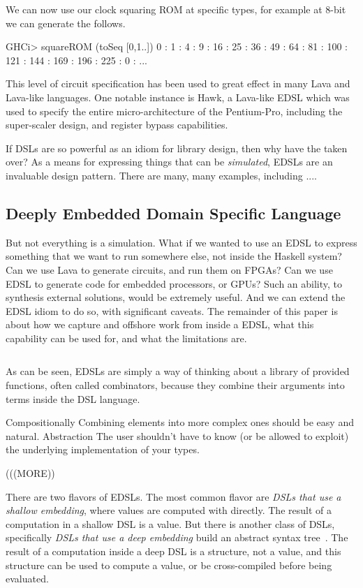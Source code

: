 \documentclass[11pt]{article}
\newcommand{\cursor}{%
\begin{center}
\marginpar{\vskip 4pt\sc Cursor}
\begin{tabular*}{\linewidth}{c}
\hline
\end{tabular*}
\end{center}
}
\begin{document}
We can now use our clock squaring ROM at specific types,
for example at 8-bit we can generate the follows.
\begin{Code}
GHCi> squareROM (toSeq [0,1..])        
0 : 1 : 4 : 9 : 16 : 25 : 36 : 49 : 64 : 81 : 100 : 121 : 144 : 169 : 196 : 225 : 0 : ...
\end{Code}

This level of circuit specification has been used to great
effect in many Lava and Lava-like languages. One notable
instance is Hawk, a Lava-like EDSL which was used to specify
the entire micro-architecture of the Pentium-Pro, including the
super-scaler design, and register bypass capabilities.

If DSLs are so powerful as an idiom for library design, then why have the taken over?
As a means for expressing things that can be {\em simulated\/}, EDSLs are an invaluable
design pattern. There are many, many examples, including ....

\subsection{Deeply Embedded Domain Specific Language}

But not everything is a simulation. What if we wanted to use an EDSL to express
something that we want to run somewhere else, not inside the Haskell system?
Can we use Lava to generate circuits, and run them on FPGAs? Can we use EDSL
to generate code for embedded processors, or GPUs? Such an ability, to 
synthesis external solutions, would be extremely useful. And we can extend
the EDSL idiom to do so, with significant caveats. The remainder of this
paper is about how we capture and offshore work from inside a EDSL, what
this capability can be used for, and what the limitations are.

\cursor{}

As can be seen, EDSLs are simply a way of thinking about a library
of provided functions, often called combinators, because they combine
their arguments into terms inside the DSL language.

Compositionally
Combining elements into more complex ones should be easy and natural.
Abstraction
The user shouldn’t have to know (or be allowed to exploit) the underlying implementation of your types.

(((MORE))

There are two flavors of EDSLs.
The most common flavor are
{\em DSLs that use a shallow embedding\/}, where values are computed with directly.
The result of a computation in a shallow DSL is a value.
But there is another class of DSLs, 
specifically {\em DSLs that use a deep embedding\/} build an abstract syntax tree~\cite{Elliott:03:CompileDSEL-JFP}.
The result of a computation inside a deep DSL
is a structure, not a value, and this structure can be used to compute a value,
or be cross-compiled before being evaluated.
\end{document}
